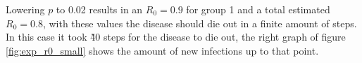 
Lowering $p$ to 0.02 results in an $R_0=0.9$ for group 1 and a total estimated $R_0=0.8$,
with these values the disease should die out in a finite amount of steps.
In this case it took \~40 steps for the disease to die out, the right graph of figure \ref{fig:exp_r0_small}
shows the amount of new infections up to that point.

